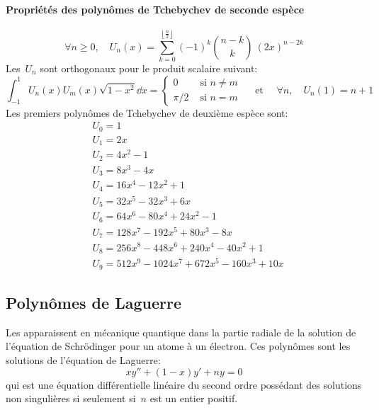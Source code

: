 \paragraph{Propriétés des polynômes de Tchebychev de seconde espèce} 
\begin{equation}
\forall n\ge 0, \quad U_n(x)=\sum_{k=0}^{\left\lfloor \frac n2\right \rfloor}(-1)^k \binom{n-k}k~(2x)^{n-2k} 
\end{equation}
Les~$U_n$ sont orthogonaux pour le produit scalaire suivant: 
\begin{equation}
\int_{-1}^1 U_n(x)U_m(x)\sqrt{1-x^2}\dd x = 
\begin{cases} 0&\text{ si } n\ne m\\ \pi/2 &\text{ si } n=m 
\end{cases} 
\quad\text{ et }\quad\forall n,\quad U_n(1)=n+1 
\end{equation}
Les premiers polynômes de Tchebychev de deuxième espèce sont:
\begin{equation}
\begin{aligned}
&U_0 = 1 \\
&U_1 = 2x \\
&U_2 = 4x^2 - 1 \\
&U_3 = 8x^3 - 4x \\
&U_4 = 16x^4 - 12x^2 + 1 \\
&U_5 = 32x^5 - 32x^3 + 6x \\
&U_6 = 64x^6 - 80x^4 + 24x^2 - 1 \\
&U_7 = 128x^7 - 192x^5 + 80x^3 - 8x \\
&U_8 = 256x^8 - 448 x^6 + 240 x^4 - 40 x^2 + 1 \\
&U_9 = 512x^9 - 1024 x^7 + 672 x^5 - 160 x^3 + 10 x
\end{aligned}
\end{equation}

\medskip
\subsection{Polynômes de Laguerre} 

Les  apparaissent en mécanique quantique dans la partie radiale de la solution de l'équation de Schrödinger pour un atome à un électron. Ces polynômes sont les solutions de l'équation de Laguerre: 
\begin{equation}
 xy'' + (1 - x)y' + ny = 0 
\end{equation}
qui est une équation différentielle linéaire du second ordre possédant des solutions non singulières si seulement si~$n$ est un entier positif. 

